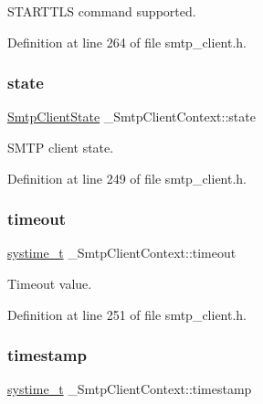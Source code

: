 S\+T\+A\+R\+T\+T\+LS command supported. 



Definition at line 264 of file smtp\+\_\+client.\+h.

\mbox{\label{struct__SmtpClientContext_a7c137fa400a3ee3144d9c376dbb762ab}} 
\subsubsection{\texorpdfstring{state}{state}}
{\footnotesize\ttfamily \hyperlink{smtp__client_8h_a02fc964f050527db806d949976661212}{Smtp\+Client\+State} \+\_\+\+Smtp\+Client\+Context\+::state}



S\+M\+TP client state. 



Definition at line 249 of file smtp\+\_\+client.\+h.

\mbox{\label{struct__SmtpClientContext_a99a21bfd307945df4944cb48bbc48539}} 
\subsubsection{\texorpdfstring{timeout}{timeout}}
{\footnotesize\ttfamily \hyperlink{compiler__port_8h_ae3e32a98d431a02106616da3071832dd}{systime\+\_\+t} \+\_\+\+Smtp\+Client\+Context\+::timeout}



Timeout value. 



Definition at line 251 of file smtp\+\_\+client.\+h.

\mbox{\label{struct__SmtpClientContext_ae828b596e3e5e7bdacbfd8ebea198b5f}} 
\subsubsection{\texorpdfstring{timestamp}{timestamp}}
{\footnotesize\ttfamily \hyperlink{compiler__port_8h_ae3e32a98d431a02106616da3071832dd}{systime\+\_\+t} \+\_\+\+Smtp\+Client\+Context\+::timestamp}



